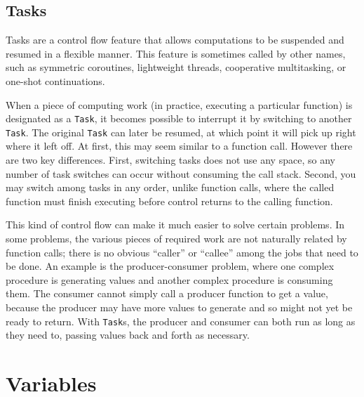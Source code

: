 \documentclass{article}
\renewcommand{\sec}[1]{\label{sec:#1}}
\begin{document}

\subsection{Tasks}\sec{tasks}

Tasks are a control flow feature that allows computations to be suspended
and resumed in a flexible manner. This feature is sometimes called by other
names, such as symmetric coroutines, lightweight threads,
cooperative multitasking, or one-shot continuations.

When a piece of computing work (in practice, executing a particular function)
is designated as a \verb|Task|, it becomes possible to interrupt it by
switching to another \verb|Task|. The original \verb|Task| can later be
resumed, at which point it will pick up right where it left off. At first,
this may seem similar to a function call. However there are two key
differences. First, switching tasks does not use any space, so any number
of task switches can occur without consuming the call stack. Second, you
may switch among tasks in any order, unlike function calls, where the called
function must finish executing before control returns to the calling
function.

This kind of control flow can make it much easier to solve certain problems.
In some problems, the various pieces of required work are not naturally
related by function calls; there is no obvious ``caller''
or ``callee'' among the jobs that need to be done. An example is the
producer-consumer problem, where one complex procedure is generating values
and another complex procedure is consuming them. The consumer cannot simply
call a producer function to get a value, because the producer may have
more values to generate and so might not yet be ready to return. With
\verb|Task|s, the producer and consumer can both run as long as they need to,
passing values back and forth as necessary.

\section{Variables}
\end{document}
